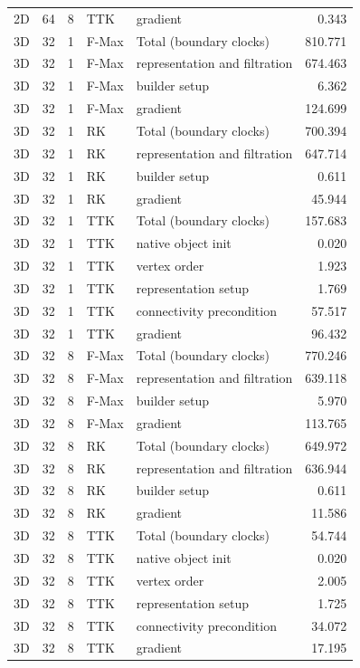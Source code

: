\begin{tabular}{lrrllr}
2D & 64 & 8 & TTK & gradient & 0.343 \\
3D & 32 & 1 & F-Max & Total (boundary clocks) & 810.771 \\
3D & 32 & 1 & F-Max & representation and filtration & 674.463 \\
3D & 32 & 1 & F-Max & builder setup & 6.362 \\
3D & 32 & 1 & F-Max & gradient & 124.699 \\
3D & 32 & 1 & RK & Total (boundary clocks) & 700.394 \\
3D & 32 & 1 & RK & representation and filtration & 647.714 \\
3D & 32 & 1 & RK & builder setup & 0.611 \\
3D & 32 & 1 & RK & gradient & 45.944 \\
3D & 32 & 1 & TTK & Total (boundary clocks) & 157.683 \\
3D & 32 & 1 & TTK & native object init & 0.020 \\
3D & 32 & 1 & TTK & vertex order & 1.923 \\
3D & 32 & 1 & TTK & representation setup & 1.769 \\
3D & 32 & 1 & TTK & connectivity precondition & 57.517 \\
3D & 32 & 1 & TTK & gradient & 96.432 \\
3D & 32 & 8 & F-Max & Total (boundary clocks) & 770.246 \\
3D & 32 & 8 & F-Max & representation and filtration & 639.118 \\
3D & 32 & 8 & F-Max & builder setup & 5.970 \\
3D & 32 & 8 & F-Max & gradient & 113.765 \\
3D & 32 & 8 & RK & Total (boundary clocks) & 649.972 \\
3D & 32 & 8 & RK & representation and filtration & 636.944 \\
3D & 32 & 8 & RK & builder setup & 0.611 \\
3D & 32 & 8 & RK & gradient & 11.586 \\
3D & 32 & 8 & TTK & Total (boundary clocks) & 54.744 \\
3D & 32 & 8 & TTK & native object init & 0.020 \\
3D & 32 & 8 & TTK & vertex order & 2.005 \\
3D & 32 & 8 & TTK & representation setup & 1.725 \\
3D & 32 & 8 & TTK & connectivity precondition & 34.072 \\
3D & 32 & 8 & TTK & gradient & 17.195 \\
\hline
\end{tabular}
